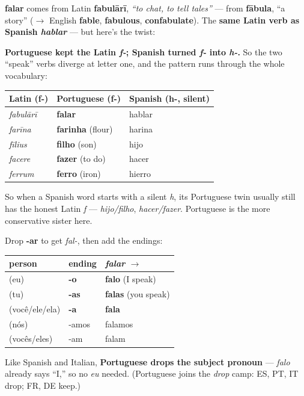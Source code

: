 \begin{cousinweb}
\textbf{falar} comes from Latin \textbf{fabulārī}, \emph{\textquotedblleft{}to chat, to tell tales\textquotedblright{}} — from \textbf{fābula}, \textquotedblleft{}a story\textquotedblright{} ($\to$ English \textbf{fable}, \textbf{fabulous}, \textbf{confabulate}). The \textbf{same Latin verb as Spanish \emph{hablar}} — but here's the twist:

\textbf{Portuguese kept the Latin \emph{f-}; Spanish turned \emph{f-} into \emph{h-}.} So the two \textquotedblleft{}speak\textquotedblright{} verbs diverge at letter one, and the pattern runs through the whole vocabulary:

\noindent
\begin{tabularx}{\linewidth}{@{}>{\raggedright\arraybackslash}X>{\raggedright\arraybackslash}X>{\raggedright\arraybackslash}X@{}}
\toprule
\textbf{Latin (f-)} & \textbf{Portuguese (f-)} & \textbf{Spanish (h-, silent)} \\
\midrule
\emph{fabulārī} & \textbf{falar} & hablar \\
\emph{farīna} & \textbf{farinha} (flour) & harina \\
\emph{fīlius} & \textbf{filho} (son) & hijo \\
\emph{facere} & \textbf{fazer} (to do) & hacer \\
\emph{ferrum} & \textbf{ferro} (iron) & hierro \\
\bottomrule
\end{tabularx}

So when a Spanish word starts with a silent \emph{h}, its Portuguese twin usually still has the honest Latin \emph{f} — \emph{hijo/filho}, \emph{hacer/fazer}. Portuguese is the more conservative sister here.
\end{cousinweb}

\begin{grammarlens}[title={Grammar Lens: the -ar present tense (pro-drop)}]
Drop \textbf{-ar} to get \emph{fal-}, then add the endings:

\noindent
\begin{tabularx}{\linewidth}{@{}>{\raggedright\arraybackslash}X>{\raggedright\arraybackslash}X>{\raggedright\arraybackslash}X@{}}
\toprule
\textbf{person} & \textbf{ending} & \textbf{\emph{falar} $\to$} \\
\midrule
(eu) & \textbf{-o} & \textbf{falo} (I speak) \\
(tu) & \textbf{-as} & \textbf{falas} (you speak) \\
(você/ele/ela) & \textbf{-a} & \textbf{fala} \\
(nós) & -amos & falamos \\
(vocês/eles) & -am & falam \\
\bottomrule
\end{tabularx}

Like Spanish and Italian, \textbf{Portuguese drops the subject pronoun} — \emph{falo} already says \textquotedblleft{}I,\textquotedblright{} so no \emph{eu} needed. (Portuguese joins the \emph{drop} camp: ES, PT, IT drop; FR, DE keep.)
\end{grammarlens}

